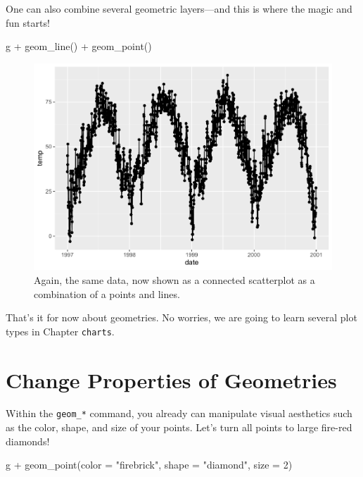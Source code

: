 \documentclass[
]{krantz}
\makeatletter
\newenvironment{Shaded}{\begin{snugshade}}{\end{snugshade}}
\newcommand{\AttributeTok}[1]{\textcolor[rgb]{0.61,0.61,0.61}{#1}}
\newcommand{\DecValTok}[1]{\textcolor[rgb]{0.06,0.06,0.06}{#1}}
\newcommand{\FunctionTok}[1]{\textcolor[rgb]{0,0,0}{#1}}
\newcommand{\NormalTok}[1]{#1}
\newcommand{\SpecialCharTok}[1]{\textcolor[rgb]{0,0,0}{#1}}
\newcommand{\StringTok}[1]{\textcolor[rgb]{0.5,0.5,0.5}{#1}}
\newenvironment{kframe}{%
\medskip{}
\setlength{\fboxsep}{.8em}
 \def\at@end@of@kframe{}%
 \ifinner\ifhmode%
  \def\at@end@of@kframe{\end{minipage}}%
  \begin{minipage}{\columnwidth}%
 \fi\fi%
 \def\FrameCommand##1{\hskip\@totalleftmargin \hskip-\fboxsep
 \colorbox{shadecolor}{##1}\hskip-\fboxsep
     \hskip-\linewidth \hskip-\@totalleftmargin \hskip\columnwidth}%
 \MakeFramed {\advance\hsize-\width
   \@totalleftmargin\z@ \linewidth\hsize
   \@setminipage}}%
 {\par\unskip\endMakeFramed%
 \at@end@of@kframe}
\renewenvironment{Shaded}{\begin{kframe}}{\end{kframe}}
\makeatother
\begin{document}
One can also combine several geometric layers---and this is where the magic and fun starts!

\begin{Shaded}
\begin{Highlighting}[]
\NormalTok{g }\SpecialCharTok{+} \FunctionTok{geom\_line}\NormalTok{() }\SpecialCharTok{+} \FunctionTok{geom\_point}\NormalTok{()}
\end{Highlighting}
\end{Shaded}

\begin{figure}
\centering
\includegraphics{bookdown_files/figure-latex/ggplot-default-line-point-1.pdf}
\caption{\label{fig:ggplot-default-line-point}Again, the same data, now shown as a connected scatterplot as a combination of a points and lines.}
\end{figure}

That's it for now about geometries. No worries, we are going to learn several plot types in Chapter \texttt{charts}.

\hypertarget{prop}{%
\section{Change Properties of Geometries}\label{prop}}

Within the \texttt{geom\_*} command, you already can manipulate visual aesthetics such as the color, shape, and size of your points. Let's turn all points to large fire-red diamonds!

\begin{Shaded}
\begin{Highlighting}[]
\NormalTok{g }\SpecialCharTok{+} \FunctionTok{geom\_point}\NormalTok{(}\AttributeTok{color =} \StringTok{"firebrick"}\NormalTok{, }\AttributeTok{shape =} \StringTok{"diamond"}\NormalTok{, }\AttributeTok{size =} \DecValTok{2}\NormalTok{)}
\end{Highlighting}
\end{Shaded}
\end{document}
